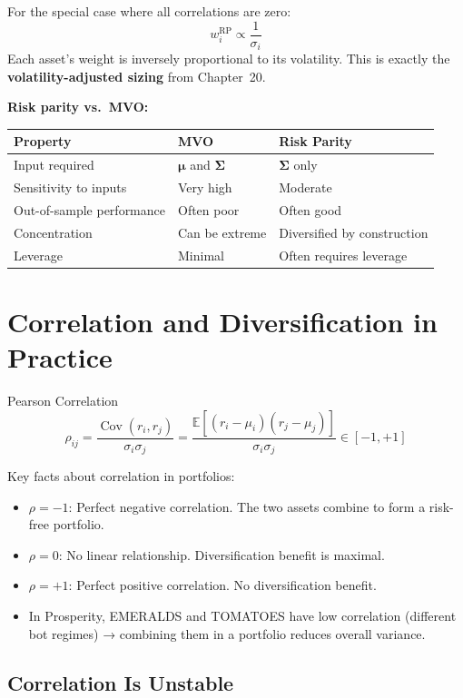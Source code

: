 \documentclass[12pt,a4paper,openany]{report}
\theoremstyle{definition}
\newcommand{\E}{\mathbb{E}}
\newcommand{\Cov}{\operatorname{Cov}}
\begin{document}
For the special case where all correlations are zero:
\[
  w_i^{\text{RP}} \propto \frac{1}{\sigma_i}
\]
Each asset's weight is inversely proportional to its volatility. This is exactly the \textbf{volatility-adjusted sizing} from Chapter~20.

\textbf{Risk parity vs.\ MVO:}
\begin{center}
\begin{tabular}{lll}
\toprule
\textbf{Property} & \textbf{MVO} & \textbf{Risk Parity} \\
\midrule
Input required & $\boldsymbol{\mu}$ and $\boldsymbol{\Sigma}$ & $\boldsymbol{\Sigma}$ only \\
Sensitivity to inputs & Very high & Moderate \\
Out-of-sample performance & Often poor & Often good \\
Concentration & Can be extreme & Diversified by construction \\
Leverage & Minimal & Often requires leverage \\
\bottomrule
\end{tabular}
\end{center}

\section{Correlation and Diversification in Practice}

\begin{definitionbox}{Pearson Correlation}
\[
  \rho_{ij} = \frac{\Cov(r_i, r_j)}{\sigma_i \sigma_j} = \frac{\E[(r_i - \mu_i)(r_j - \mu_j)]}{\sigma_i \sigma_j} \in [-1, +1]
\]
\end{definitionbox}

Key facts about correlation in portfolios:
\begin{itemize}
  \item $\rho = -1$: Perfect negative correlation. The two assets combine to form a risk-free portfolio.
  \item $\rho = 0$: No linear relationship. Diversification benefit is maximal.
  \item $\rho = +1$: Perfect positive correlation. No diversification benefit.
  \item In Prosperity, EMERALDS and TOMATOES have low correlation (different bot regimes) → combining them in a portfolio reduces overall variance.
\end{itemize}

\subsection{Correlation Is Unstable}
\end{document}
